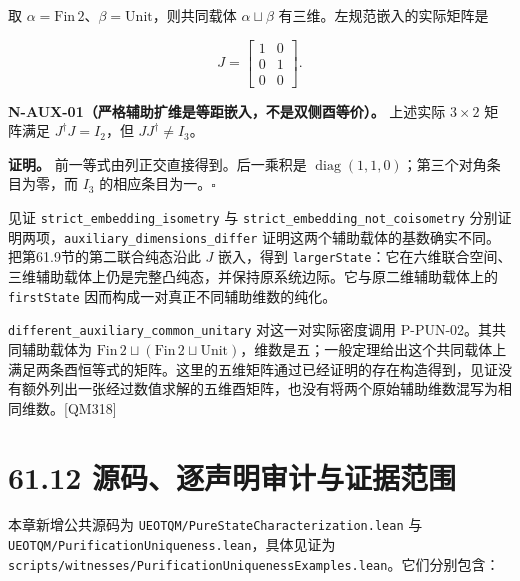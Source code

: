 \documentclass[
  11pt,
  oneside]{book}
\begin{document}
取 \(\alpha=\mathrm{Fin}\,2\)、\(\beta=\mathrm{Unit}\)，则共同载体
\(\alpha\sqcup\beta\) 有三维。左规范嵌入的实际矩阵是

\[
J=\begin{bmatrix}1&0\\0&1\\0&0\end{bmatrix}.
\]

\protect\hypertarget{n-aux-01}{}{}

\textbf{N-AUX-01（严格辅助扩维是等距嵌入，不是双侧酉等价）。} 上述实际
\(3\times2\) 矩阵满足 \(J^\dagger J=I_2\)，但 \(JJ^\dagger\ne I_3\)。

\textbf{证明。} 前一等式由列正交直接得到。后一乘积是
\(\operatorname{diag}(1,1,0)\)；第三个对角条目为零，而 \(I_3\)
的相应条目为一。\(\square\)

见证 \texttt{strict\_\allowbreak embedding\_\allowbreak isometry} 与
\texttt{strict\_\allowbreak embedding\_\allowbreak not\_\allowbreak coisometry}
分别证明两项，\texttt{auxiliary\_\allowbreak dimensions\_\allowbreak differ}
证明这两个辅助载体的基数确实不同。把第61.9节的第二联合纯态沿此 \(J\)
嵌入，得到
\texttt{largerState}：它在六维联合空间、三维辅助载体上仍是完整凸纯态，并保持原系统边际。它与原二维辅助载体上的
\texttt{firstState} 因而构成一对真正不同辅助维数的纯化。

\texttt{different\_\allowbreak auxiliary\_\allowbreak common\_\allowbreak unitary} 对这一对实际密度调用
P-PUN-02。其共同辅助载体为
\(\mathrm{Fin}\,2\sqcup(\mathrm{Fin}\,2\sqcup\mathrm{Unit})\)，维数是五；一般定理给出这个共同载体上满足两条酉恒等式的矩阵。这里的五维矩阵通过已经证明的存在构造得到，见证没有额外列出一张经过数值求解的五维酉矩阵，也没有将两个原始辅助维数混写为相同维数。{[}QM318{]}

\hypertarget{ux6e90ux7801ux9010ux58f0ux660eux5ba1ux8ba1ux4e0eux8bc1ux636eux8303ux56f4}{%
\section{61.12
源码、逐声明审计与证据范围}\label{ux6e90ux7801ux9010ux58f0ux660eux5ba1ux8ba1ux4e0eux8bc1ux636eux8303ux56f4}}

本章新增公共源码为 \texttt{UEOTQM/PureStateCharacterization.lean} 与
\texttt{UEOTQM/PurificationUniqueness.lean}，具体见证为
\texttt{scripts/witnesses/PurificationUniquenessExamples.lean}。它们分别包含：
\end{document}

